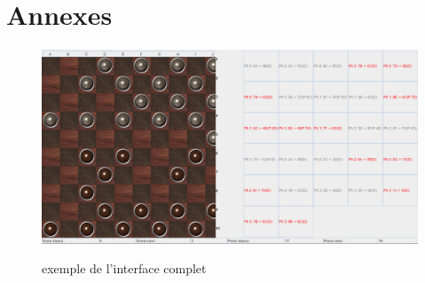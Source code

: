 \documentclass[11pt]{article} %
\begin{document}
\section{Annexes}
\begin{figure}[!ht]
\caption{exemple de l'interface complet}
\label{fig_sim}
\centering
{
\includegraphics[width=6in]{5}
\label{paysage}
}
\end{figure}
\end{document}
